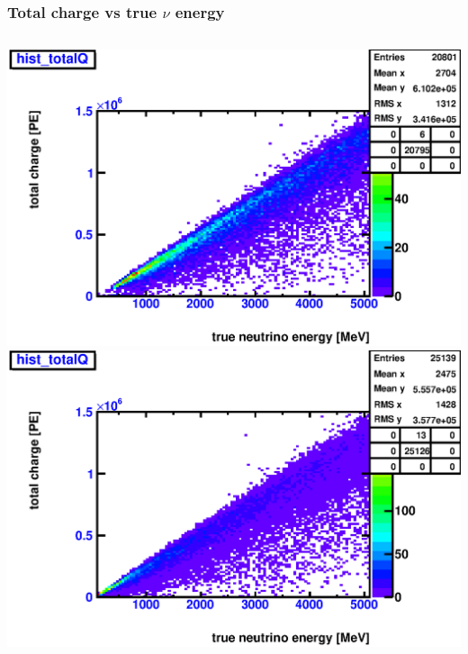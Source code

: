 \documentclass{beamer}
\begin{document}
\begin{frame}
	\frametitle{Total charge vs true $\nu$ energy}
	\begin{columns}[t]
		\includegraphics[width=1.0\textwidth]{nue_H1_totalChargeVSTrueNuEnergy_onlyCC_maxR600cm.eps}
		\includegraphics[width=1.0\textwidth]{nue_C12_totalChargeVSTrueNuEnergy_onlyCC_maxR600cm.eps}
	\end{columns}
\end{frame}
\end{document}
